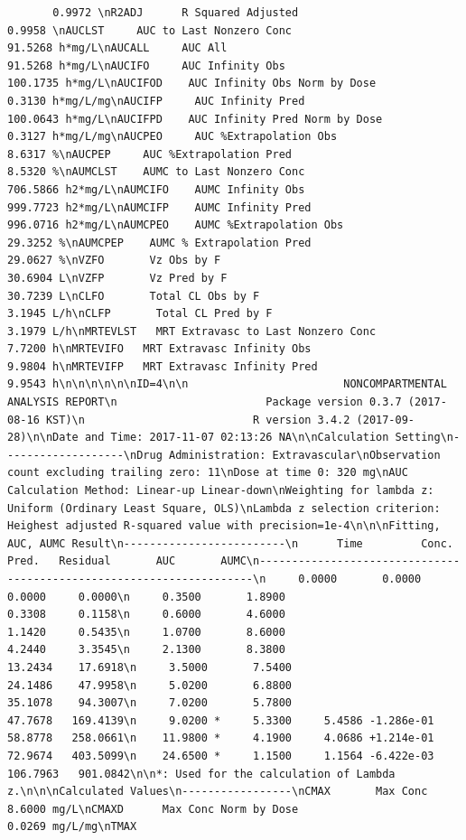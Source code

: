 \documentclass[12pt,]{krantz}
\theoremstyle{definition}
\theoremstyle{definition}
\theoremstyle{definition}
\theoremstyle{remark}
\begin{document}
\begin{verbatim}
       0.9972 \nR2ADJ      R Squared Adjusted                              0.9958 \nAUCLST     AUC to Last Nonzero Conc                       91.5268 h*mg/L\nAUCALL     AUC All                                        91.5268 h*mg/L\nAUCIFO     AUC Infinity Obs                              100.1735 h*mg/L\nAUCIFOD    AUC Infinity Obs Norm by Dose                   0.3130 h*mg/L/mg\nAUCIFP     AUC Infinity Pred                             100.0643 h*mg/L\nAUCIFPD    AUC Infinity Pred Norm by Dose                  0.3127 h*mg/L/mg\nAUCPEO     AUC %Extrapolation Obs                          8.6317 %\nAUCPEP     AUC %Extrapolation Pred                         8.5320 %\nAUMCLST    AUMC to Last Nonzero Conc                     706.5866 h2*mg/L\nAUMCIFO    AUMC Infinity Obs                             999.7723 h2*mg/L\nAUMCIFP    AUMC Infinity Pred                            996.0716 h2*mg/L\nAUMCPEO    AUMC %Extrapolation Obs                        29.3252 %\nAUMCPEP    AUMC % Extrapolation Pred                      29.0627 %\nVZFO       Vz Obs by F                                    30.6904 L\nVZFP       Vz Pred by F                                   30.7239 L\nCLFO       Total CL Obs by F                               3.1945 L/h\nCLFP       Total CL Pred by F                              3.1979 L/h\nMRTEVLST   MRT Extravasc to Last Nonzero Conc              7.7200 h\nMRTEVIFO   MRT Extravasc Infinity Obs                      9.9804 h\nMRTEVIFP   MRT Extravasc Infinity Pred                     9.9543 h\n\n\n\n\n\nID=4\n\n                        NONCOMPARTMENTAL ANALYSIS REPORT\n                       Package version 0.3.7 (2017-08-16 KST)\n                          R version 3.4.2 (2017-09-28)\n\nDate and Time: 2017-11-07 02:13:26 NA\n\nCalculation Setting\n-------------------\nDrug Administration: Extravascular\nObservation count excluding trailing zero: 11\nDose at time 0: 320 mg\nAUC Calculation Method: Linear-up Linear-down\nWeighting for lambda z: Uniform (Ordinary Least Square, OLS)\nLambda z selection criterion: Heighest adjusted R-squared value with precision=1e-4\n\n\nFitting, AUC, AUMC Result\n-------------------------\n      Time         Conc.      Pred.   Residual       AUC       AUMC\n---------------------------------------------------------------------\n     0.0000       0.0000                           0.0000     0.0000\n     0.3500       1.8900                           0.3308     0.1158\n     0.6000       4.6000                           1.1420     0.5435\n     1.0700       8.6000                           4.2440     3.3545\n     2.1300       8.3800                          13.2434    17.6918\n     3.5000       7.5400                          24.1486    47.9958\n     5.0200       6.8800                          35.1078    94.3007\n     7.0200       5.7800                          47.7678   169.4139\n     9.0200 *     5.3300     5.4586 -1.286e-01    58.8778   258.0661\n    11.9800 *     4.1900     4.0686 +1.214e-01    72.9674   403.5099\n    24.6500 *     1.1500     1.1564 -6.422e-03   106.7963   901.0842\n\n*: Used for the calculation of Lambda z.\n\n\nCalculated Values\n-----------------\nCMAX       Max Conc                                        8.6000 mg/L\nCMAXD      Max Conc Norm by Dose                           0.0269 mg/L/mg\nTMAX       
\end{verbatim}
\end{document}
